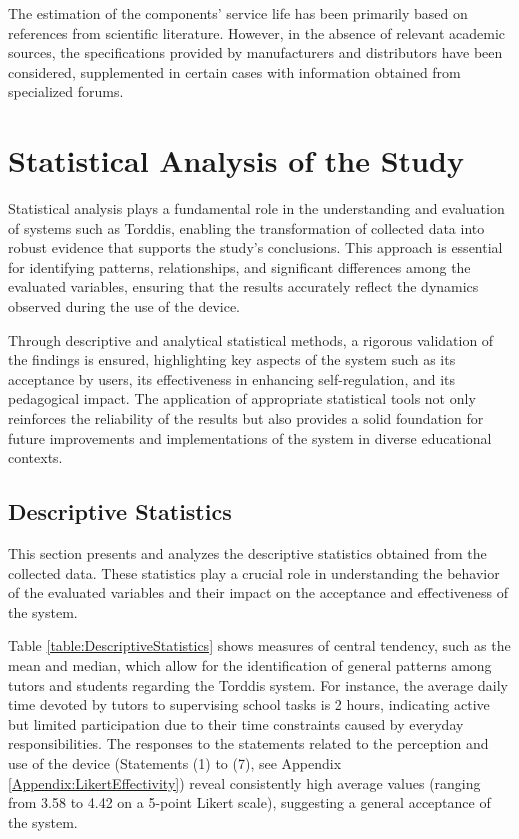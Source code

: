                 The estimation of the components’ service life has been primarily based on references from scientific literature. However, in the absence of relevant academic sources, the specifications provided by manufacturers and distributors have been considered, supplemented in certain cases with information obtained from specialized forums.
                
                \section{Statistical Analysis of the Study}
                \label{section:seventh}
                Statistical analysis plays a fundamental role in the understanding and evaluation of systems such as Torddis, enabling the transformation of collected data into robust evidence that supports the study’s conclusions. This approach is essential for identifying patterns, relationships, and significant differences among the evaluated variables, ensuring that the results accurately reflect the dynamics observed during the use of the device.
                
                Through descriptive and analytical statistical methods, a rigorous validation of the findings is ensured, highlighting key aspects of the system such as its acceptance by users, its effectiveness in enhancing self-regulation, and its pedagogical impact. The application of appropriate statistical tools not only reinforces the reliability of the results but also provides a solid foundation for future improvements and implementations of the system in diverse educational contexts.
                
                \subsection{Descriptive Statistics}
                This section presents and analyzes the descriptive statistics obtained from the collected data. These statistics play a crucial role in understanding the behavior of the evaluated variables and their impact on the acceptance and effectiveness of the system.
                
                Table \ref{table:DescriptiveStatistics} shows measures of central tendency, such as the mean and median, which allow for the identification of general patterns among tutors and students regarding the Torddis system. For instance, the average daily time devoted by tutors to supervising school tasks is 2 hours, indicating active but limited participation due to their time constraints caused by everyday responsibilities. The responses to the statements related to the perception and use of the device (Statements (1) to (7), see Appendix \ref{Appendix:LikertEffectivity}) reveal consistently high average values (ranging from 3.58 to 4.42 on a 5-point Likert scale), suggesting a general acceptance of the system.
                
